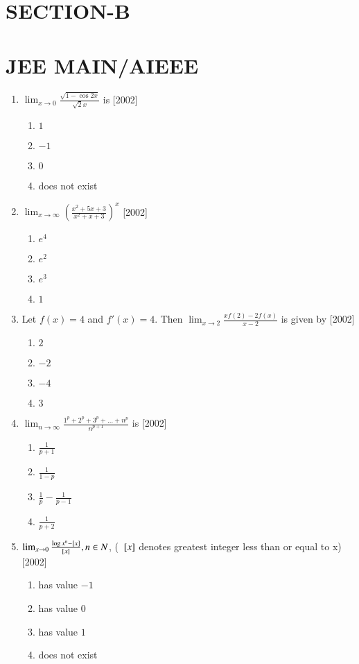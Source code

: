 \documentclass[journal,12pt,twocolumn]{IEEEtran}
\theoremstyle{remark}
\begin{document}
\section*{SECTION-B}
\section*{JEE MAIN/AIEEE}
\begin{enumerate}
    \item $\lim_{x\to 0}{\frac{\sqrt{1-\cos{2x}}}{\sqrt{2}x}}$ is
	    \hfill[2002]
    \begin{enumerate}
			\item $1$
			\item $-1$
			\item $0$
			\item does not exist
		\end{enumerate}
    \item  $\lim_{x\to \infty}({\frac{x^2+5x+3}{x^2+x+3}})^x$
	    \hfill[2002]
    \begin{enumerate}
			\item $e^4$
			\item $e^2$
			\item $e^3$
			\item $1$
		\end{enumerate}
    \item Let $f(x)=4$ and $f'(x)=4$. Then $\lim_{x\to 2}{\frac{xf(2)-2f(x)}{x-2}}$ is given by
	    \hfill[2002]
    \begin{enumerate}
			\item $2$
			\item $-2$
			\item $-4$
			\item $3$
		\end{enumerate}
    \item $\lim_{n\to \infty}{\frac{1^p+2^p+3^p+\dots+n^p}{n^{p+1}}}$ is
	    \hfill[2002]
    \begin{enumerate}
			\item $\frac{1}{p+1}$
			\item $\frac{1}{1-p}$
			\item $\frac{1}{p}-\frac{1}{p-1}$
			\item $\frac{1}{p+2}$
		\end{enumerate}
	\item $\lim_{x\to 0}{\frac{\log x^n- {}\left[x\right]}{{}\left[x\right]}}, n\in N$, ( ${}\left[x\right]$ denotes greatest integer less than or equal to x)
	    \hfill[2002]
    \begin{enumerate}
			\item has value $-1$
			\item has value $0$
			\item has value $1$
			\item does not exist
		\end{enumerate}

\end{enumerate}
\end{document}
